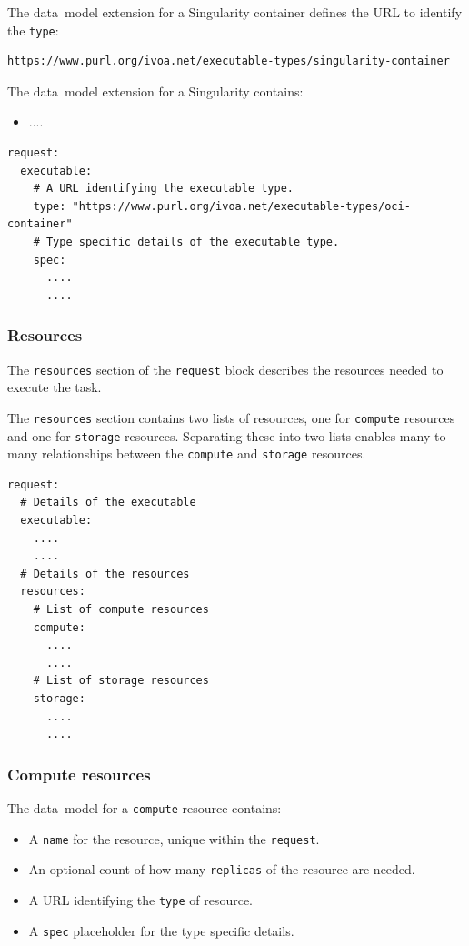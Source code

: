 \documentclass[11pt,a4paper]{ivoa}
\newcommand{\datamodel} {data~model}
\newcommand{\singularity} {Singularity}
\newcommand{\codeword}[1] {\texttt{#1}}
\begin{document}
The \datamodel{} extension for a \singularity{} container defines the URL
to identify the \codeword{type}:
\begin{lstlisting}[]
https://www.purl.org/ivoa.net/executable-types/singularity-container
\end{lstlisting}
\hfill \break
The \datamodel{} extension for a \singularity{} contains:
\begin{itemize}
    \item ....
\end{itemize}

\begin{lstlisting}[]
request:
  executable:
    # A URL identifying the executable type.
    type: "https://www.purl.org/ivoa.net/executable-types/oci-container"
    # Type specific details of the executable type.
    spec:
      ....
      ....
\end{lstlisting}

\subsubsection{Resources}
\label{datamodel-resources}

The \codeword{resources} section of the \codeword{request} block describes the resources needed
to execute the task.

The \codeword{resources} section contains two lists of resources, one for
\codeword{compute} resources and one for \codeword{storage} resources.
Separating these into two lists enables many-to-many relationships between the \codeword{compute}
and \codeword{storage} resources.

\begin{lstlisting}[]
request:
  # Details of the executable
  executable:
    ....
    ....
  # Details of the resources
  resources:
    # List of compute resources
    compute:
      ....
      ....
    # List of storage resources
    storage:
      ....
      ....
\end{lstlisting}

\subsubsection{Compute resources}
\label{datamodel-compute-resources}

The \datamodel{} for a \codeword{compute} resource contains:
\begin{itemize}
    \item A \codeword{name} for the resource, unique within the \codeword{request}.
    \item An optional count of how many \codeword{replicas} of the resource are needed.
    \item A URL identifying the \codeword{type} of resource.
    \item A \codeword{spec} placeholder for the type specific details.
\end{itemize}
\end{document}
